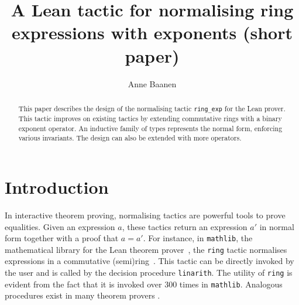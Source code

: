 \documentclass{llncs}
\title{A Lean tactic for normalising ring\\ expressions with exponents (short paper)}
\author{Anne Baanen}
\institute{Vrije Universiteit Amsterdam, Amsterdam, The Netherlands\\\email{t.baanen@vu.nl}}
\newcommand{\lean}[1]{\texttt{#1}\xspace} %
\newcommand{\mathlib}{\texttt{mathlib}\xspace}
\newcommand{\ring}{\lean{ring}}
\newcommand{\ringexp}{\lean{ring\_exp}}
\begin{document}
\maketitle

\begin{abstract}
This paper describes the design of the normalising tactic \ringexp for the Lean prover.
This tactic improves on existing tactics by extending commutative rings with a binary exponent operator.
An inductive family of types represents the normal form, enforcing various invariants.
The design can also be extended with more operators.
\end{abstract}

\section{Introduction}

In interactive theorem proving, normalising tactics are powerful tools to prove equalities.
Given an expression $a$, these tactics return an expression $a'$ in normal form together with a proof that $a = a'$.
For instance, in \mathlib, the mathematical library for the Lean theorem prover~\cite{lean-prover},
the \ring tactic normalises %
expressions in a commutative (semi)ring~\cite{mathlib}.
This tactic can be directly invoked by the user
and is called by the decision procedure \lean{linarith}.
The utility of \ring is evident from the fact that it is invoked over 300 times in \mathlib.
Analogous procedures exist in many theorem provers \cite{agda, hol_light, isabelle_hol}.
\end{document}
